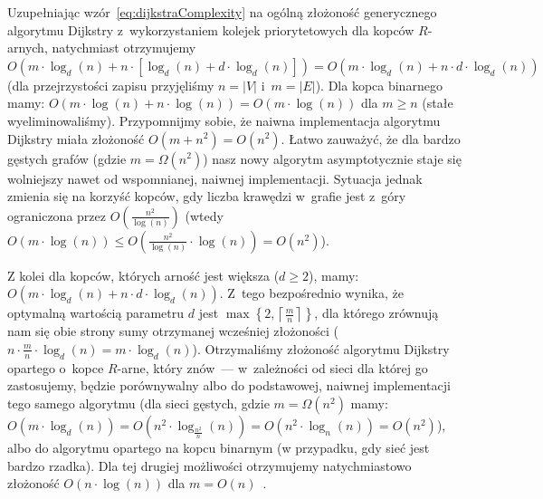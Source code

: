 Uzupełniając wzór~\ref{eq:dijkstraComplexity} na ogólną złożoność generycznego algorytmu Dijkstry z~wykorzystaniem kolejek priorytetowych dla kopców $R$-arnych, natychmiast otrzymujemy $O \left( m \cdot \log_{d} \left( n \right) + n \cdot \left[ \log_{d} \left( n \right) + d \cdot \log_{d} \left( n \right) \right] \right) = O \left( m \cdot \log_{d} \left( n \right) + n \cdot d \cdot \log_{d} \left( n \right) \right)$ (dla przejrzystości zapisu przyjęliśmy $n = \left| V\right|$ i~$m = \left| E \right|$).
Dla kopca binarnego mamy: $O \left( m \cdot \log \left( n \right) + n \cdot \log \left( n \right) \right) = O \left( m \cdot \log \left( n \right) \right)$ dla $m \geqslant n$ (stałe wyeliminowaliśmy).
Przypomnijmy sobie, że naiwna implementacja algorytmu Dijkstry miała złożoność $O \left( m + n^{2} \right) = O \left( n^{2} \right)$.
Łatwo zauważyć, że dla bardzo gęstych grafów (gdzie $m = \Omega \left( n^{2} \right)$) nasz nowy algorytm asymptotycznie staje się wolniejszy nawet od wspomnianej, naiwnej implementacji.
Sytuacja jednak zmienia się na korzyść kopców, gdy liczba krawędzi w~grafie jest z~góry ograniczona przez $O \left( \frac{n^{2}}{ \log \left( n \right) } \right)$ (wtedy $O \left( m \cdot \log \left( n \right) \right) \leqslant O \left( \frac{n^{2}}{\log \left( n \right)} \cdot \log \left( n \right) \right) = O \left( n^{2} \right)$).

Z kolei dla kopców, których arność jest większa ($d \geqslant 2$), mamy: $O \left( m \cdot \log_{d} \left( n \right) + n \cdot d \cdot \log_{d} \left( n \right) \right)$.
Z~tego bezpośrednio wynika, że optymalną wartością parametru $d$ jest $\max \left\{ 2, \left \lceil \frac{m}{n} \right \rceil \right\}$, dla którego zrównują nam się obie strony sumy otrzymanej wcześniej złożoności ($n \cdot \frac{m}{n} \cdot \log_{d} \left( n \right) = m \cdot \log_{d} \left( n \right)$).
Otrzymaliśmy złożoność algorytmu Dijkstry opartego o~kopce $R$-arne, który znów~--- w~zależności od sieci dla której go zastosujemy, będzie porównywalny albo do podstawowej, naiwnej implementacji tego samego algorytmu (dla sieci gęstych, gdzie $m = \Omega \left( n^{2} \right)$ mamy: $O \left( m \cdot \log_{d} \left( n \right) \right) = O \left( n^{2} \cdot \log_{\frac{n^{2}}{n}} \left( n \right) \right) = O \left( n^{2} \cdot \log_{n} \left( n \right) \right) = O \left( n^{2} \right)$), albo do algorytmu opartego na kopcu binarnym (w przypadku, gdy sieć jest bardzo rzadka).
Dla tej drugiej możliwości otrzymujemy natychmiastowo złożoność $O \left( n \cdot \log \left( n \right) \right)$ dla $m = O \left( n \right)$~\cite[$2.2$]{OR}.

